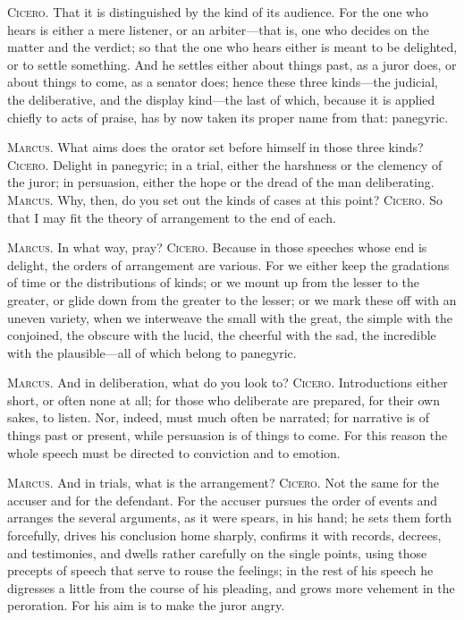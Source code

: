  \textsc{Cicero.} That it is distinguished by the kind of its audience. For the one who hears is either a mere listener, or an arbiter—that is, one who decides on the matter and the verdict; so that the one who hears either is meant to be delighted, or to settle something. And he settles either about things past, as a juror does, or about things to come, as a senator does; hence these three kinds—the judicial, the deliberative, and the display kind—the last of which, because it is applied chiefly to acts of praise, has by now taken its proper name from that: panegyric.

 \textsc{Marcus.} What aims does the orator set before himself in those three kinds? \textsc{Cicero.} Delight in panegyric; in a trial, either the harshness or the clemency of the juror; in persuasion, either the hope or the dread of the man deliberating. \textsc{Marcus.} Why, then, do you set out the kinds of cases at this point? \textsc{Cicero.} So that I may fit the theory of arrangement to the end of each.

 \textsc{Marcus.} In what way, pray? \textsc{Cicero.} Because in those speeches whose end is delight, the orders of arrangement are various. For we either keep the gradations of time or the distributions of kinds; or we mount up from the lesser to the greater, or glide down from the greater to the lesser; or we mark these off with an uneven variety, when we interweave the small with the great, the simple with the conjoined, the obscure with the lucid, the cheerful with the sad, the incredible with the plausible—all of which belong to panegyric.

 \textsc{Marcus.} And in deliberation, what do you look to? \textsc{Cicero.} Introductions either short, or often none at all; for those who deliberate are prepared, for their own sakes, to listen. Nor, indeed, must much often be narrated; for narrative is of things past or present, while persuasion is of things to come. For this reason the whole speech must be directed to conviction and to emotion.

 \textsc{Marcus.} And in trials, what is the arrangement? \textsc{Cicero.} Not the same for the accuser and for the defendant. For the accuser pursues the order of events and arranges the several arguments, as it were spears, in his hand; he sets them forth forcefully, drives his conclusion home sharply, confirms it with records, decrees, and testimonies, and dwells rather carefully on the single points, using those precepts of speech that serve to rouse the feelings; in the rest of his speech he digresses a little from the course of his pleading, and grows more vehement in the peroration. For his aim is to make the juror angry.


